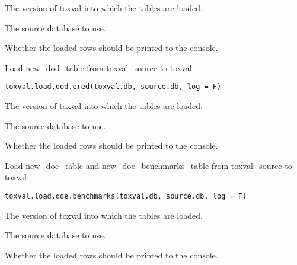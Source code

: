 \documentclass[letterpaper]{book}
\begin{document}
%
\begin{Arguments}
\begin{ldescription}
\item[\code{toxval.db}] The version of toxval into which the tables are loaded.

\item[\code{source.db}] The source database to use.

\item[\code{verbose}] Whether the loaded rows should be printed to the console.
\end{ldescription}
\end{Arguments}
%
\begin{Description}\relax
Load new\_dod\_table from toxval\_source to toxval
\end{Description}
%
\begin{Usage}
\begin{verbatim}
toxval.load.dod.ered(toxval.db, source.db, log = F)
\end{verbatim}
\end{Usage}
%
\begin{Arguments}
\begin{ldescription}
\item[\code{toxval.db}] The version of toxval into which the tables are loaded.

\item[\code{source.db}] The source database to use.

\item[\code{verbose}] Whether the loaded rows should be printed to the console.
\end{ldescription}
\end{Arguments}
%
\begin{Description}\relax
Load new\_doe\_table and new\_doe\_benchmarks\_table from toxval\_source to toxval
\end{Description}
%
\begin{Usage}
\begin{verbatim}
toxval.load.doe.benchmarks(toxval.db, source.db, log = F)
\end{verbatim}
\end{Usage}
%
\begin{Arguments}
\begin{ldescription}
\item[\code{toxval.db}] The version of toxval into which the tables are loaded.

\item[\code{source.db}] The source database to use.

\item[\code{verbose}] Whether the loaded rows should be printed to the console.
\end{ldescription}
\end{Arguments}
\end{document}
